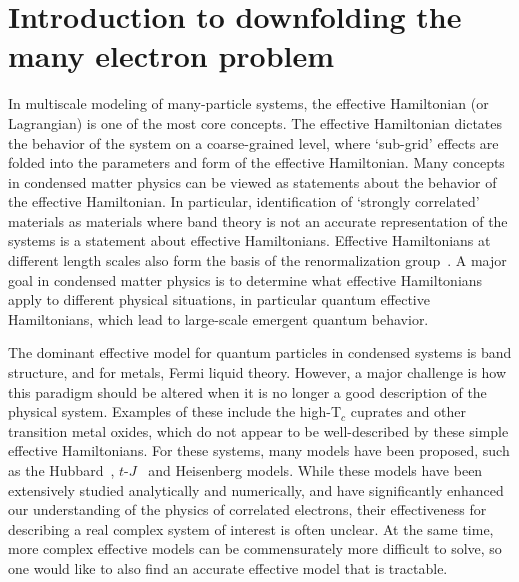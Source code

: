 \section{Introduction to downfolding the many electron problem}

In multiscale modeling of many-particle systems, the effective Hamiltonian (or Lagrangian) is one of the most core concepts. 
The effective Hamiltonian dictates the behavior of the system on a coarse-grained level, where `sub-grid' effects are folded into the parameters and form of the effective Hamiltonian. 
Many concepts in condensed matter physics can be viewed as statements about the behavior of the effective Hamiltonian. 
In particular, identification of `strongly correlated' materials as materials where band theory is not an accurate representation of the systems is a statement about effective Hamiltonians.
Effective Hamiltonians at different length scales also form the basis of the renormalization group~\cite{Wilson}.
A major goal in condensed matter physics is to determine what effective Hamiltonians apply to different physical situations, in particular quantum effective Hamiltonians, which lead to large-scale emergent quantum behavior. 

The dominant effective model for quantum particles in condensed systems is band structure, and for metals, Fermi liquid theory. 
However, a major challenge is how this paradigm should be altered when it is no longer a good description of the physical system.
Examples of these include the high-T$_c$ cuprates and other transition metal oxides, which do not appear to be well-described by these simple effective Hamiltonians. 
For these systems, many models have been proposed, such as the Hubbard~\cite{Hubbard1963}, $t$-$J$~\cite{tJSpalek} and Heisenberg models.
While these models have been extensively studied analytically and numerically, and have significantly enhanced our understanding of the physics of correlated electrons, their effectiveness for describing a real complex system of interest is often unclear. 
At the same time, more complex effective models can be commensurately more difficult to solve,  so one would like to also find an accurate effective model that is tractable. 


